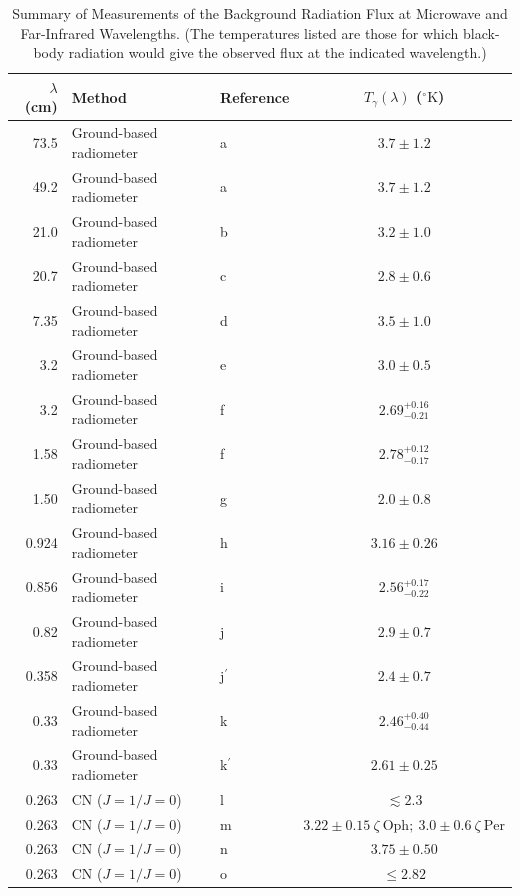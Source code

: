 \begingroup
\renewcommand{\thetable}{15.1}
\begin{table}[htbp]
  \centering
  \caption{Summary of Measurements of the Background Radiation Flux at
  Microwave and Far-Infrared Wavelengths. (The temperatures listed are those
  for which black-body radiation would give the observed flux at the indicated
  wavelength.)}
  \label{tab:15.1}
  \scriptsize
  \setlength{\tabcolsep}{3.5pt}
  \begin{tabular}{@{}rllc@{}}
    \toprule
    \(\lambda\) (cm) & Method & Reference & \(T_\gamma(\lambda)\)
    (\(^{\circ}\mathrm{K}\))\\
    \midrule
    73.5 & Ground-based radiometer & a & \(3.7\pm1.2\)\\
    49.2 & Ground-based radiometer & a & \(3.7\pm1.2\)\\
    21.0 & Ground-based radiometer & b & \(3.2\pm1.0\)\\
    20.7 & Ground-based radiometer & c & \(2.8\pm0.6\)\\
    7.35 & Ground-based radiometer & d & \(3.5\pm1.0\)\\
    3.2 & Ground-based radiometer & e & \(3.0\pm0.5\)\\
    3.2 & Ground-based radiometer & f & \(2.69^{+0.16}_{-0.21}\)\\
    1.58 & Ground-based radiometer & f & \(2.78^{+0.12}_{-0.17}\)\\
    1.50 & Ground-based radiometer & g & \(2.0\pm0.8\)\\
    0.924 & Ground-based radiometer & h & \(3.16\pm0.26\)\\
    0.856 & Ground-based radiometer & i & \(2.56^{+0.17}_{-0.22}\)\\
    0.82 & Ground-based radiometer & j & \(2.9\pm0.7\)\\
    0.358 & Ground-based radiometer & j\(^{\prime}\) & \(2.4\pm0.7\)\\
    0.33 & Ground-based radiometer & k & \(2.46^{+0.40}_{-0.44}\)\\
    0.33 & Ground-based radiometer & k\(^{\prime}\) & \(2.61\pm0.25\)\\
    0.263 & CN (\(J=1/J=0\)) & l & \(\lesssim2.3\)\\
    0.263 & CN (\(J=1/J=0\)) & m &
      \(3.22\pm0.15\ \zeta\mathrm{\ Oph};\ 3.0\pm0.6\ \zeta\mathrm{\ Per}\)\\
    0.263 & CN (\(J=1/J=0\)) & n & \(3.75\pm0.50\)\\
    0.263 & CN (\(J=1/J=0\)) & o & \(\leq2.82\)\\

\end{tabular}
\end{table}
